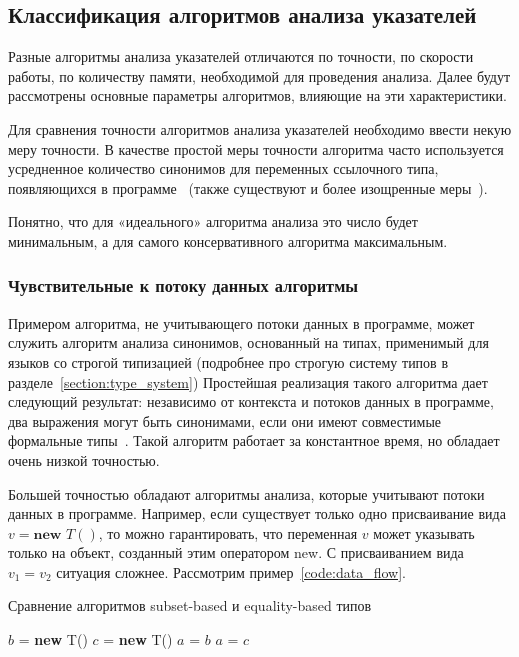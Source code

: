 \documentclass[14pt,titlepage]{extarticle}
\newcommand{\NEW}{\textbf{new }}
\newcommand{\eng}[1]{{\English#1}}
\begin{document}
    \subsection{Классификация алгоритмов анализа указателей}
    \label{section:analysis_classification}

      Разные алгоритмы анализа указателей отличаются по точности, по скорости
      работы, по количеству памяти, необходимой для проведения анализа.
      Далее будут рассмотрены основные параметры алгоритмов, влияющие на эти
      характеристики.

      Для сравнения точности алгоритмов анализа указателей необходимо ввести
      некую меру точности. В качестве простой меры точности алгоритма часто
      используется усредненное количество синонимов для переменных ссылочного
      типа, появляющихся в
      программе~\cite[раздел~3.2]{hind_pointer_analysis_not_solved_yet}
      (также существуют и более изощренные
      меры~\cite{hind_pointer_analysis_not_solved_yet,diwan_tbaa}).

      Понятно, что для «идеального» алгоритма анализа это число будет
      минимальным, а для самого консервативного алгоритма максимальным.

      \subsubsection{Чувствительные к потоку данных алгоритмы}
        \label{section:analysis_classification_data_flow}

        Примером алгоритма, не учитывающего потоки данных в программе, может
        служить алгоритм анализа синонимов, основанный на типах, применимый
        для языков со строгой типизацией (подробнее про строгую систему типов в
        разделе~\ref{section:type_system})
        Простейшая реализация такого алгоритма дает следующий результат:
        независимо от контекста и потоков данных в программе, два выражения
        могут быть синонимами, если они имеют совместимые формальные
        типы~\cite[раздел~2.2]{diwan_tbaa}.
        Такой алгоритм работает за константное время, но обладает очень низкой
        точностью.

        Большей точностью обладают алгоритмы анализа, которые учитывают потоки
        данных в программе.
        Например, если существует только одно присваивание вида $v = \NEW T()$,
        то можно гарантировать, что переменная $v$ может указывать только на
        объект, созданный этим оператором \eng{new}.
        С присваиванием вида $v_1 = v_2$ ситуация сложнее. Рассмотрим
        пример~\ref{code:data_flow}.
        \begin{algorithm}
          \caption{Сравнение алгоритмов \eng{subset-based} и
                                        \eng{equality-based} типов}
          \label{code:data_flow}
          \begin{algorithmic}[1]
            \STATE $b$ = \NEW T()
            \STATE $c$ = \NEW T()
            \STATE $a$ = $b$
            \STATE $a$ = $c$
          \end{algorithmic}
        \end{algorithm}
\end{document}
